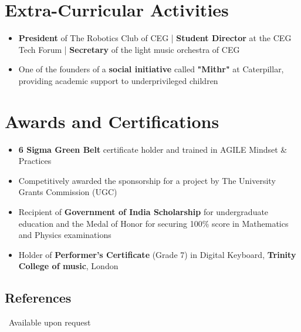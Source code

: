 \documentclass[a4paper,10pt]{article} %
\begin{document}
\section{Extra-Curricular Activities}
\begin{itemize} \itemsep -2pt %
\item \textbf{President} of The Robotics Club of CEG | \textbf{Student Director} at the CEG Tech Forum | \textbf{Secretary} of the light music orchestra of CEG    		
\item One of the founders of a \textbf{social initiative} called \textbf{"Mithr"} at Caterpillar, providing academic support to underprivileged children
\end{itemize}




\section{Awards and Certifications}
\begin{itemize} \itemsep -2pt %
\item \textbf{6 Sigma Green Belt} certificate holder and trained in AGILE Mindset \& Practices
\item Competitively awarded the sponsorship for a project by The University Grants Commission (UGC)
\item Recipient of \textbf{Government of India Scholarship} for undergraduate education and the Medal of Honor for securing 100\% score in Mathematics and Physics examinations
\item Holder of \textbf{Performer’s Certificate} (Grade 7) in Digital Keyboard, \textbf{Trinity College of music}, London
\end{itemize}


\subsection{References}
\ Available upon request
\end{document}
